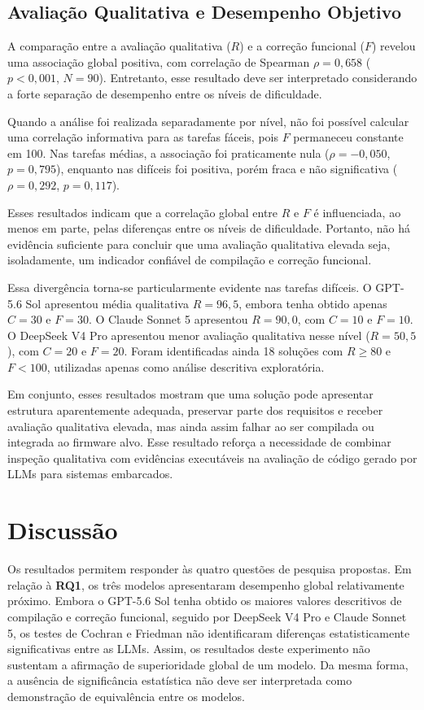 \documentclass[12pt]{article}
\begin{document}
\subsection{Avaliação Qualitativa e Desempenho Objetivo}
\label{sec:qualitativa-objetiva}

A comparação entre a avaliação qualitativa ($R$) e a correção funcional ($F$) revelou uma associação global positiva, com correlação de Spearman $\rho=0{,}658$ ($p<0{,}001$, $N=90$). Entretanto, esse resultado deve ser interpretado considerando a forte separação de desempenho entre os níveis de dificuldade.

Quando a análise foi realizada separadamente por nível, não foi possível calcular uma correlação informativa para as tarefas fáceis, pois $F$ permaneceu constante em 100. Nas tarefas médias, a associação foi praticamente nula ($\rho=-0{,}050$, $p=0{,}795$), enquanto nas difíceis foi positiva, porém fraca e não significativa ($\rho=0{,}292$, $p=0{,}117$).

Esses resultados indicam que a correlação global entre $R$ e $F$ é influenciada, ao menos em parte, pelas diferenças entre os níveis de dificuldade. Portanto, não há evidência suficiente para concluir que uma avaliação qualitativa elevada seja, isoladamente, um indicador confiável de compilação e correção funcional.

Essa divergência torna-se particularmente evidente nas tarefas difíceis. O GPT-5.6 Sol apresentou média qualitativa $R=96{,}5$, embora tenha obtido apenas $C=30$ e $F=30$. O Claude Sonnet 5 apresentou $R=90{,}0$, com $C=10$ e $F=10$. O DeepSeek V4 Pro apresentou menor avaliação qualitativa nesse nível ($R=50{,}5$), com $C=20$ e $F=20$. Foram identificadas ainda 18 soluções com $R\geq80$ e $F<100$, utilizadas apenas como análise descritiva exploratória.

Em conjunto, esses resultados mostram que uma solução pode apresentar estrutura aparentemente adequada, preservar parte dos requisitos e receber avaliação qualitativa elevada, mas ainda assim falhar ao ser compilada ou integrada ao firmware alvo. Esse resultado reforça a necessidade de combinar inspeção qualitativa com evidências executáveis na avaliação de código gerado por LLMs para sistemas embarcados.

\section{Discussão}
\label{sec:discussao}

Os resultados permitem responder às quatro questões de pesquisa propostas. Em relação à \textbf{RQ1}, os três modelos apresentaram desempenho global relativamente próximo. Embora o GPT-5.6 Sol tenha obtido os maiores valores descritivos de compilação e correção funcional, seguido por DeepSeek V4 Pro e Claude Sonnet 5, os testes de Cochran e Friedman não identificaram diferenças estatisticamente significativas entre as LLMs. Assim, os resultados deste experimento não sustentam a afirmação de superioridade global de um modelo. Da mesma forma, a ausência de significância estatística não deve ser interpretada como demonstração de equivalência entre os modelos.
\end{document}

